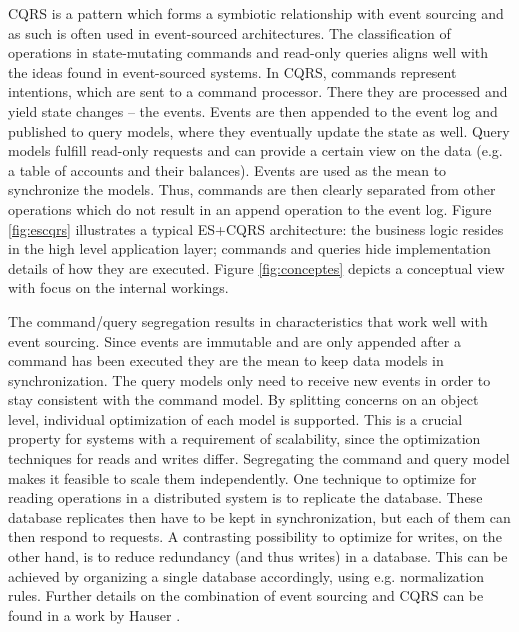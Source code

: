 CQRS is a pattern which forms a symbiotic relationship with event sourcing and 
as such is often used in event-sourced architectures.
%
The classification of operations in state-mutating commands and read-only 
queries aligns well with the ideas found in event-sourced systems.
In CQRS, commands represent intentions, which are sent to a command 
processor. There they are processed and yield state changes -- the events.
Events are then appended to the event log and published to query models,
where they eventually update the state as well. Query models fulfill read-only 
requests and can provide a certain view on the data (e.g. a table of accounts 
and their balances). Events are used as the mean to synchronize the models.
%
Thus, commands are then clearly separated from other operations which do not 
result in an append operation to the event log. 
Figure \ref{fig:escqrs} illustrates a typical ES+CQRS architecture: the 
business logic resides in the high level application layer; commands and 
queries hide implementation details of how they are executed. 
Figure \ref{fig:conceptes} depicts a conceptual view with focus on the
internal workings.

The command/query segregation results in characteristics that work well with 
event sourcing. Since events are immutable and are only appended after a 
command has been executed they are the mean to keep data models in 
synchronization. The query models only need to receive new events in order to 
stay consistent with the command model. 
By splitting concerns on an object level, individual optimization of each 
model is supported. 
This is a crucial property for systems with a requirement of scalability,
since the optimization techniques for reads and writes differ.
Segregating the command and query model makes it feasible to scale them 
independently. One technique to optimize for reading operations in a 
distributed system is to replicate the database. These database replicates 
then have to be kept in synchronization, but each of them can then respond 
to requests. A contrasting possibility to optimize for writes, on the other 
hand, is to reduce redundancy (and thus writes) in a database. This can be 
achieved by organizing a single database accordingly, using e.g. normalization 
rules. Further details on the combination of event sourcing and CQRS can be 
found in a work by Hauser \cite{Hauser2014}.

